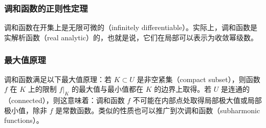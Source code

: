 \subsubsection{调和函数的正则性定理}
调和函数在开集上是无限可微的（infinitely differentiable）。实际上，调和函数是实解析函数（real analytic）的，也就是说，它们在局部可以表示为收敛幂级数。
\subsubsection{最大值原理}
调和函数满足以下最大值原理：若 \( K \subset U \) 是非空紧集（compact subset），则函数 \( f \) 在 \( K \) 上的限制 \( f|_{K} \) 的最大值与最小值都在 \( K \) 的边界上取得。若 \( U \) 是连通的（connected），则这意味着：调和函数 \( f \) 不可能在内部点处取得局部极大值或局部极小值，除非 \( f \) 是常数函数。类似的性质也可以推广到次调和函数（subharmonic functions）。

